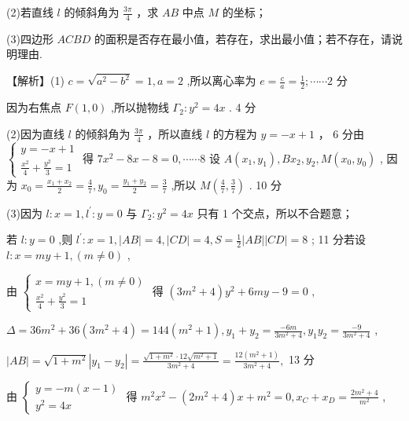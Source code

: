 \documentclass[10pt]{article}
\begin{document}
(2)若直线 \(l\) 的倾斜角为 \(\frac{3\pi }{4}\) ，求 \({AB}\) 中点 \(M\) 的坐标；

(3)四边形 \({ACBD}\) 的面积是否存在最小值，若存在，求出最小值；若不存在，请说明理由.

【解析】(1) \(c = \sqrt{{a}^{2} - {b}^{2}} = 1,a = 2\) ,所以离心率为 \(e = \frac{c}{a} = \frac{1}{2};\cdots \cdots 2\) 分

因为右焦点 \(F\left( {1,0}\right)\) ,所以抛物线 \({\Gamma }_{2} : {y}^{2} = {4x}\) . 4 分

(2)因为直线 \(l\) 的倾斜角为 \(\frac{3\pi }{4}\) ，所以直线 \(l\) 的方程为 \(y =  - x + 1\) ， 6 分由 \(\left\{  \begin{array}{l} y =  - x + 1 \\  \frac{{x}^{2}}{4} + \frac{{y}^{2}}{3} = 1 \end{array}\right.\) 得 \(7{x}^{2} - {8x} - 8 = 0,\cdots \cdots 8\) 设 \(A\left( {{x}_{1},{y}_{1}}\right) ,B{x}_{2},{y}_{2},M\left( {{x}_{0},{y}_{0}}\right)\) , 因为 \({x}_{0} = \frac{{x}_{1} + {x}_{2}}{2} = \frac{4}{7},{y}_{0} = \frac{{y}_{1} + {y}_{2}}{2} = \frac{3}{7}\) ,所以 \(M\left( {\frac{4}{7},\frac{3}{7}}\right)\) . 10 分

(3)因为 \(l : x = 1,{l}^{\prime } : y = 0\) 与 \({\Gamma }_{2} : {y}^{2} = {4x}\) 只有 1 个交点，所以不合题意；

若 \(l : y = 0\) ,则 \({l}^{\prime } : x = 1,\left| {AB}\right|  = 4,\left| {CD}\right|  = 4,S = \frac{1}{2}\left| {AB}\right| \left| {CD}\right|  = 8\) ; 11 分若设 \(l : x = {my} + 1,\left( {m \neq  0}\right)\) ,

由 \(\left\{  \begin{array}{l} x = {my} + 1,\left( {m \neq  0}\right) \\  \frac{{x}^{2}}{4} + \frac{{y}^{2}}{3} = 1 \end{array}\right.\) 得 \(\left( {3{m}^{2} + 4}\right) {y}^{2} + {6my} - 9 = 0\) ,

\(\Delta  = {36}{m}^{2} + {36}\left( {3{m}^{2} + 4}\right)  = {144}\left( {{m}^{2} + 1}\right) ,{y}_{1} + {y}_{2} = \frac{-{6m}}{3{m}^{2} + 4},{y}_{1}{y}_{2} = \frac{-9}{3{m}^{2} + 4}\) ,

\(\left| {AB}\right|  = \sqrt{1 + {m}^{2}}\left| {{y}_{1} - {y}_{2}}\right|  = \frac{\sqrt{1 + {m}^{2}} \cdot  {12}\sqrt{{m}^{2} + 1}}{3{m}^{2} + 4} = \frac{{12}\left( {{m}^{2} + 1}\right) }{3{m}^{2} + 4},\) 13 分

由 \(\left\{  \begin{array}{l} y =  - m\left( {x - 1}\right) \\  {y}^{2} = {4x} \end{array}\right.\) 得 \({m}^{2}{x}^{2} - \left( {2{m}^{2} + 4}\right) x + {m}^{2} = 0,{x}_{C} + {x}_{D} = \frac{2{m}^{2} + 4}{{m}^{2}}\) ,
\end{document}
